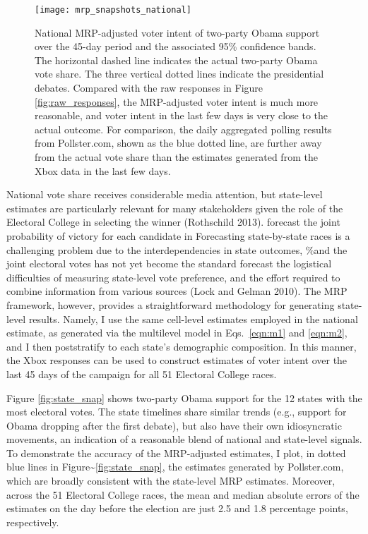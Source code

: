 \begin{figure}[p!]
  \centering
  \texttt{[image: mrp\_snapshots\_national]}
  \caption{National MRP-adjusted voter intent of two-party Obama support over
    the 45-day period and the associated 95\% confidence bands. The horizontal
    dashed line indicates the actual two-party Obama vote share. The three
    vertical dotted lines indicate the presidential debates. Compared with the raw
    responses in Figure \ref{fig:raw_responses}, the MRP-adjusted voter intent
    is much more reasonable, and voter intent in the last few days is very
    close to the actual outcome. For comparison, the daily aggregated polling
    results from Pollster.com, shown as the blue dotted line, are further away from the actual vote share
    than the estimates generated from the Xbox data in the last few days.}
  \label{fig:national_snap}
\end{figure}

National vote share receives considerable media attention, but
state-level estimates are particularly relevant for many stakeholders
given the role of the Electoral College in selecting the winner
(Rothschild 2013). forecast the joint probability of victory for each
candidate in Forecasting state-by-state races is a challenging problem
due to the interdependencies in state outcomes, \%and the joint
electoral votes has not yet become the standard forecast the logistical
difficulties of measuring state-level vote preference, and the effort
required to combine information from various sources (Lock and Gelman
2010). The MRP framework, however, provides a straightforward
methodology for generating state-level results. Namely, I use the same
cell-level estimates employed in the national estimate, as generated via
the multilevel model in Eqs.~\eqref{eqn:m1} and \eqref{eqn:m2}, and I
then poststratify to each state's demographic composition. In this
manner, the Xbox responses can be used to construct estimates of voter
intent over the last 45 days of the campaign for all 51 Electoral
College races.

Figure \ref{fig:state_snap} shows two-party Obama support for the 12
states with the most electoral votes. The state timelines share similar
trends (e.g., support for Obama dropping after the first debate), but
also have their own idiosyncratic movements, an indication of a
reasonable blend of national and state-level signals. To demonstrate the
accuracy of the MRP-adjusted estimates, I plot, in dotted blue lines in
Figure\textasciitilde{}\ref{fig:state_snap}, the estimates generated by
Pollster.com, which are broadly consistent with the state-level MRP
estimates. Moreover, across the 51 Electoral College races, the mean and
median absolute errors of the estimates on the day before the election
are just 2.5 and 1.8 percentage points, respectively.

